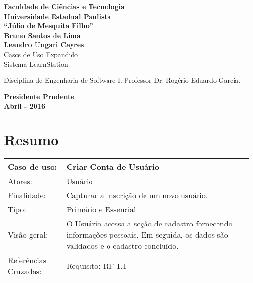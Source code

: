 \documentclass[12pt,a4paper,onecolumn,titlepage]{article}
\begin{document}

\begin{titlepage} %
	
	\vfill
	\begin{center}
	
		{\large \textbf{Faculdade de Ciências e Tecnologia\\Universidade Estadual Paulista\\``Júlio de Mesquita Filho''}} \\[3cm]
		{\large \textbf{Bruno Santos de Lima}}\\
		{\large \textbf{Leandro Ungari Cayres}}\\[4cm]
		{\Large Casos de Uso Expandido}\\
		{\Large Sistema LearnStation}\\[4cm]

	\hspace{.45\textwidth} %
	\begin{minipage}{.5\textwidth}
		\large Disciplina de Engenharia de Software I. Professor Dr. Rogério Eduardo Garcia.\\[0.5cm]
	\end{minipage}

	\vfill
	\vspace{1.5cm}
	
	\large \textbf{Presidente Prudente\\}
	\large \textbf{Abril - 2016}
	
	\end{center}
	
\end{titlepage}

\renewcommand{\baselinestretch}{1.1}

\section{Resumo}
\begin{table}[h!]
\begin{center}
\begin{tabular}{p{2.5cm} p{9.5cm}}
Caso de uso: & \textbf{Criar Conta de Usuário} \\ \hline
Atores: & Usuário \\ \hline
Finalidade: & Capturar a inscrição de um novo usuário. \\ \hline
Tipo: & Primário e Essencial\\ \hline
Visão geral: & O Usuário acessa a seção de cadastro fornecendo informações pessoais. Em seguida, os dados são validados e o cadastro concluído. \\ \hline
Referências Cruzadas: & Requisito: RF 1.1

\end{tabular}
\end{center}
\end{table}
\end{document}
